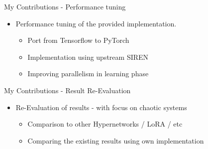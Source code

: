 \documentclass{beamer}
\begin{document}
\begin{frame}{My Contributions - Performance tuning}
\begin{itemize}
    \item Performance tuning of the provided implementation.
    \begin{itemize}
        \item Port from Tensorflow to PyTorch
        \item Implementation using upstream SIREN
        \item Improving parallelism in learning phase
    \end{itemize}
\end{itemize}
\end{frame}

\begin{frame}{My Contributions - Result Re-Evaluation}
\begin{itemize}
    \item Re-Evaluation of results - with focus on chaotic systems
    \begin{itemize}
        \item Comparison to other Hypernetworks / LoRA / etc
        \item Comparing the existing results using own implementation
    \end{itemize}
\end{itemize}
\end{frame}
\end{document}
